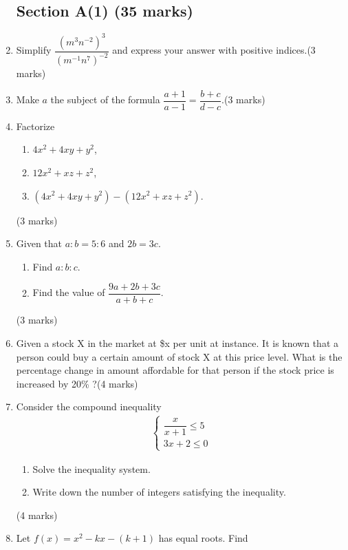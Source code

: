 \documentclass[12pt]{article}
\begin{document}
    \begin{enumerate}
        \subsection*{Section A(1) (35 marks)}
        \item Simplify $\dfrac{(m^3n^{-2})^3}{(m^{-1}n^7)^{-2}}$ and express your answer with positive indices.\hfill (3 marks)
        \item Make $a$ the subject of the formula $\dfrac{a+1}{a-1}=\dfrac{b+c}{d-c}$.\hfill (3 marks)
        \item Factorize \begin{enumerate}
            \item $4x^2+4xy+y^2$,
            \item $12x^2+xz+z^2$,
            \item $(4x^2+4xy+y^2)-(12x^2+xz+z^2)$.
        \end{enumerate}\hfill (3 marks)
        \item Given that $a:b=5:6$ and $2b=3c$.\begin{enumerate}
            \item Find $a:b:c$.
            \item Find the value of $\dfrac{9a+2b+3c}{a+b+c}$.
        \end{enumerate}\hfill (3 marks)
        \item Given a stock X in the market at \$x per unit at instance. It is known that a person could buy a certain amount of stock X at this price level. What is the percentage change in amount affordable for that person if the stock price is increased by 20\% ?\hfill (4 marks)
        \item Consider the compound inequality \begin{align*}
            \begin{cases}
                \dfrac{x}{x+1}\leq 5\\
                3x+2\leq 0
            \end{cases}
        \end{align*}
        \begin{enumerate}
            \item Solve the inequality system.
            \item Write down the number of integers satisfying the inequality.
        \end{enumerate}\hfill (4 marks)
        \item Let $f(x)=x^2-kx-(k+1)$ has equal roots. Find \begin{enumerate}

\end{enumerate}
\end{enumerate}
\end{document}

